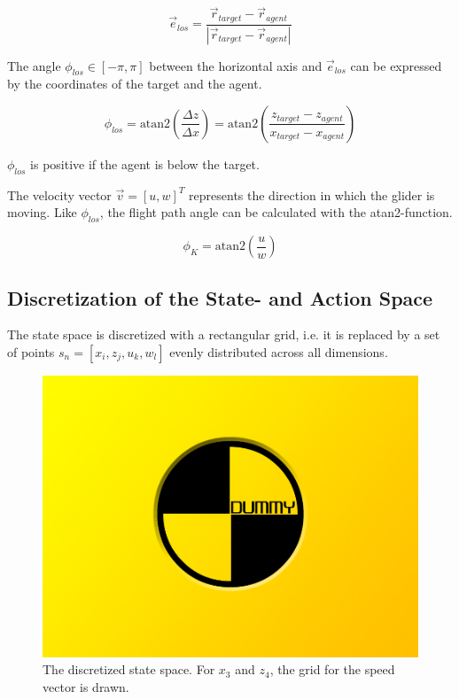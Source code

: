 \begin{equation}
\vec{e}_{los} = \frac{\vec{r}_{target}-\vec{r}_{agent}}{|\vec{r}_{target}-\vec{r}_{agent}|}
\end{equation}

The angle $\phi_{los}\in [-\pi,\pi]$ between the horizontal axis and $\vec{e}_{los}$ can be expressed by the coordinates of the target and the agent.

\begin{equation}
\phi_{los}=\text{atan2} \left( \frac{\Delta z}{\Delta x} \right) =\text{atan2}\left(\frac{z_{target}-z_{agent}}{x_{target}-x_{agent}}\right)
\end{equation}

$\phi_{los}$ is positive if the agent is below the target.

The velocity vector $\vec{v}=[u,w]^T$ represents the direction in which the glider is moving. Like $\phi_{los}$, the flight path angle can be calculated with the atan2-function.

\begin{equation}
\phi_K = \text{atan2}\left(\frac{u}{w}\right)
\end{equation}

\subsection{Discretization of the State- and Action Space}
\label{sec:disc2d}
The state space is discretized with a rectangular grid, i.e. it is replaced by a set of points $s_n=[x_i,z_j,u_k,w_l]$ evenly distributed across all dimensions.

\begin{figure}[h]
	\includegraphics[width=\textwidth]{src/pics/dummy.jpg}
	\caption{The discretized state space. For $x_3$ and $z_4$, the grid for the speed vector is drawn.}
	\label{fig:2d_state_space_discretized}
\end{figure}

